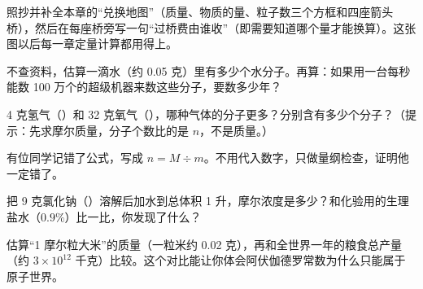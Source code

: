 \begin{sikaoti}
\item 照抄并补全本章的“兑换地图”（质量、物质的量、粒子数三个方框和四座箭头桥），然后在每座桥旁写一句“过桥费由谁收”（即需要知道哪个量才能换算）。这张图以后每一章定量计算都用得上。
\item 不查资料，估算一滴水（约 0.05 克）里有多少个水分子。再算：如果用一台每秒能数 100 万个的超级机器来数这些分子，要数多少年？
\item 4 克氢气（）和 32 克氧气（），哪种气体的分子更多？分别含有多少个分子？（提示：先求摩尔质量，分子个数比的是 $n$，不是质量。）
\item 有位同学记错了公式，写成 $n=M\div m$。不用代入数字，只做量纲检查，证明他一定错了。
\item 把 9 克氯化钠（）溶解后加水到总体积 1 升，摩尔浓度是多少？和化验用的生理盐水（$0.9\%$）比一比，你发现了什么？
\item 估算“1 摩尔粒大米”的质量（一粒米约 0.02 克），再和全世界一年的粮食总产量（约 $3\times 10^{12}$ 千克）比较。这个对比能让你体会阿伏伽德罗常数为什么只能属于原子世界。
\end{sikaoti}
